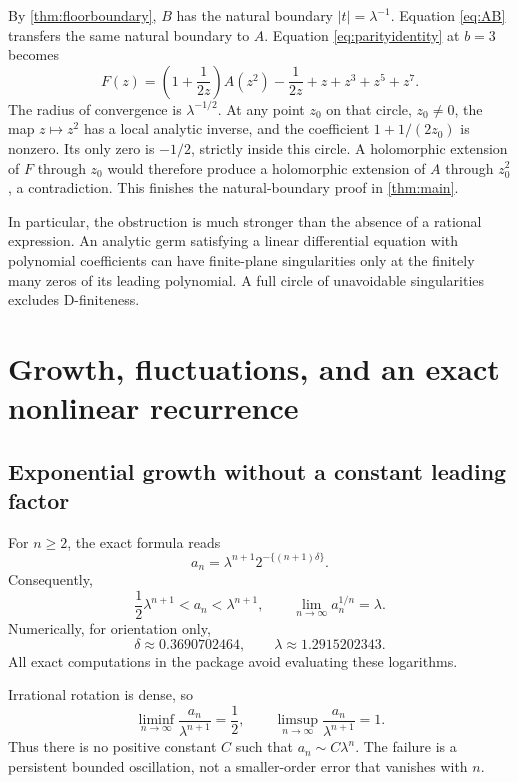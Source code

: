 \documentclass[11pt,letterpaper]{article}
\numberwithin{equation}{section}
\theoremstyle{definition}
\theoremstyle{remark}
\begin{document}
By \cref{thm:floorboundary}, $B$ has the natural boundary $|t|=\lambda^{-1}$. Equation \eqref{eq:AB} transfers the same natural boundary to $A$. Equation \eqref{eq:parityidentity} at $b=3$ becomes
\begin{equation}\label{eq:F3}
 F(z)=\left(1+\frac1{2z}\right)A(z^2)-\frac1{2z}
       +z+z^3+z^5+z^7.
\end{equation}
The radius of convergence is $\lambda^{-1/2}$. At any point $z_0$ on that circle, $z_0\ne0$, the map $z\mapsto z^2$ has a local analytic inverse, and the coefficient $1+1/(2z_0)$ is nonzero. Its only zero is $-1/2$, strictly inside this circle. A holomorphic extension of $F$ through $z_0$ would therefore produce a holomorphic extension of $A$ through $z_0^2$, a contradiction. This finishes the natural-boundary proof in \cref{thm:main}.

In particular, the obstruction is much stronger than the absence of a rational expression. An analytic germ satisfying a linear differential equation with polynomial coefficients can have finite-plane singularities only at the finitely many zeros of its leading polynomial. A full circle of unavoidable singularities excludes D-finiteness.

\section{Growth, fluctuations, and an exact nonlinear recurrence}\label{sec:growth}

\subsection{Exponential growth without a constant leading factor}
For $n\ge2$, the exact formula reads
\begin{equation}\label{eq:fluctuation}
 a_n=\lambda^{n+1}2^{-\{(n+1)\delta\}}.
\end{equation}
Consequently,
\begin{equation}\label{eq:growthbounds}
 \frac12\lambda^{n+1}<a_n<\lambda^{n+1},\qquad
 \lim_{n\to\infty}a_n^{1/n}=\lambda.
\end{equation}
Numerically, for orientation only,
\[
 \delta\approx0.3690702464,\qquad \lambda\approx1.2915202343.
\]
All exact computations in the package avoid evaluating these logarithms.

Irrational rotation is dense, so
\begin{equation}\label{eq:limsup}
 \liminf_{n\to\infty}\frac{a_n}{\lambda^{n+1}}=\frac12,
 \qquad
 \limsup_{n\to\infty}\frac{a_n}{\lambda^{n+1}}=1.
\end{equation}
Thus there is no positive constant $C$ such that $a_n\sim C\lambda^n$. The failure is a persistent bounded oscillation, not a smaller-order error that vanishes with $n$.
\end{document}
